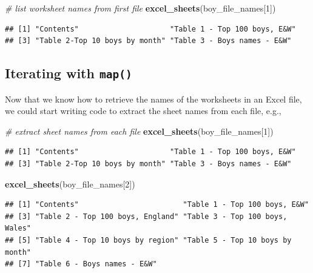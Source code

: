 \documentclass[
]{book}
\newenvironment{Shaded}{\begin{snugshade}}{\end{snugshade}}
\newcommand{\CommentTok}[1]{\textcolor[rgb]{0.56,0.35,0.01}{\textit{#1}}}
\newcommand{\DecValTok}[1]{\textcolor[rgb]{0.00,0.00,0.81}{#1}}
\newcommand{\KeywordTok}[1]{\textcolor[rgb]{0.13,0.29,0.53}{\textbf{#1}}}
\newcommand{\NormalTok}[1]{#1}
\begin{document}
\begin{Shaded}
\begin{Highlighting}[]
\CommentTok{\# list worksheet names from first file}
\KeywordTok{excel\_sheets}\NormalTok{(boy\_file\_names[}\DecValTok{1}\NormalTok{])}
\end{Highlighting}
\end{Shaded}

\begin{verbatim}
## [1] "Contents"                     "Table 1 - Top 100 boys, E&W" 
## [3] "Table 2-Top 10 boys by month" "Table 3 - Boys names - E&W"
\end{verbatim}

\hypertarget{iterating-with-map}{%
\subsection{\texorpdfstring{Iterating with \texttt{map()}}{Iterating with map()}}\label{iterating-with-map}}

Now that we know how to retrieve the names of the worksheets in an Excel file, we could start writing code to extract the sheet names from each file, e.g.,

\begin{Shaded}
\begin{Highlighting}[]
\CommentTok{\# extract sheet names from each file}
\KeywordTok{excel\_sheets}\NormalTok{(boy\_file\_names[}\DecValTok{1}\NormalTok{])}
\end{Highlighting}
\end{Shaded}

\begin{verbatim}
## [1] "Contents"                     "Table 1 - Top 100 boys, E&W" 
## [3] "Table 2-Top 10 boys by month" "Table 3 - Boys names - E&W"
\end{verbatim}

\begin{Shaded}
\begin{Highlighting}[]
\KeywordTok{excel\_sheets}\NormalTok{(boy\_file\_names[}\DecValTok{2}\NormalTok{])}
\end{Highlighting}
\end{Shaded}

\begin{verbatim}
## [1] "Contents"                        "Table 1 - Top 100 boys, E&W"    
## [3] "Table 2 - Top 100 boys, England" "Table 3 - Top 100 boys, Wales"  
## [5] "Table 4 - Top 10 boys by region" "Table 5 - Top 10 boys by month" 
## [7] "Table 6 - Boys names - E&W"
\end{verbatim}
\end{document}
